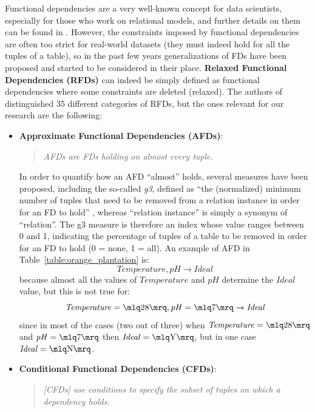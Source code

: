 Functional dependencies are a very well-known concept for data scientists, especially for those who work on relational models, and further details on them can be found in \cite{abiteboul1995foundations}.
However, the constraints imposed by functional dependencies are often too strict for real-world datasets (they must indeed hold for all the tuples of a table), so in the past few years generalizations of FDs have been proposed and started to be considered in their place. \textbf{Relaxed Functional Dependencies (RFDs)} can indeed be simply defined as functional dependencies where some constraints are deleted (relaxed). The authors of \cite{caruccio2015relaxed} distinguished 35 different categories of RFDs, but the ones relevant for our research are the following:
\begin{itemize}
\item \textbf{Approximate Functional Dependencies (AFDs)}:
\begin{quote}\emph{AFDs are FDs holding on almost every tuple.} \cite[p.~151]{caruccio2015relaxed}\end{quote}
In order to quantify how an AFD ``almost'' holds, several measures have been proposed, including the so-called \textit{g3}, defined as ``the (normalized) minimum number of tuples that need to be removed from a relation instance in order for an FD to hold'' \cite[p.~151]{caruccio2015relaxed}, whereas ``relation instance'' is simply a synonym of ``relation''. The g3 measure is therefore an index whose value ranges between 0 and 1, indicating the percentage of tuples of a table to be removed in order for an FD to hold (0 = none, 1 = all). An example of AFD in Table~\ref{table:orange_plantation} is: \[\mathit{Temperature}, \mathit{pH} \rightarrow \mathit{Ideal}\] because almost all the values of \(\mathit{Temperature}\) and \(\mathit{pH}\) determine the \(\mathit{Ideal}\) value, but this is not true for: \[\mathit{Temperature} = \mlq 28 \mrq, \mathit{pH} = \mlq 7 \mrq \rightarrow \mathit{Ideal}\] since in most of the cases (two out of three) when \(\mathit{Temperature} = \mlq 28 \mrq\) and \(\mathit{pH} = \mlq 7 \mrq\) then \(\mathit{Ideal} = \mlq \mathrm{Y} \mrq\), but in one case \(\mathit{Ideal} = \mlq \mathrm{N} \mrq\).
\item \textbf{Conditional Functional Dependencies (CFDs)}:
\begin{quote}\emph{\emph{[CFDs]} use conditions to specify the subset of tuples on which a dependency holds.} \cite[p.~152]{caruccio2015relaxed}\end{quote}

\end{itemize}
